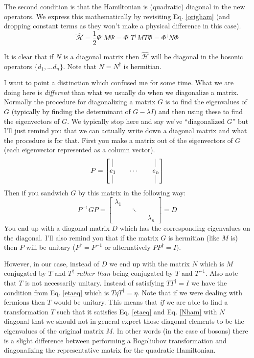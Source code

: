 \documentclass[12pt]{article}
\begin{document}
The second condition is that the Hamiltonian is (quadratic) diagonal in the new operators. We express this mathematically by revisiting Eq. \ref{origham} (and dropping constant terms as they won't make a physical difference in this case).
\begin{equation}
\label{Nham}
\hat{\mathcal{H}} = \frac{1}{2} \Psi^{\dagger} M \Psi = \Phi^{\dagger}T^{\dagger} M T \Phi = \Phi^{\dagger} N \Phi
\end{equation}

It is clear that if $N$ is a diagonal matrix then $\hat{\mathcal{H}}$ will be diagonal in the bosonic operators $\{d_1, ... d_n\}$. Note that $N=N^{\dag}$ is hermitian.

I want to point a distinction which confused me for some time. What we are doing here is \textit{different} than what we usually do when we diagonalize a matrix. Normally the procedure for diagonalizing a matrix $G$ is to find the eigenvalues of $G$ (typically by finding the determinant of $G-\lambda I$) and then using these to find the eigenvectors of $G$. We typically stop here and say we've ``diagonalized $G$'' but I'll just remind you that we can actually write down a diagonal matrix and what the procedure is for that. First you make a matrix out of the eigenvectors of $G$ (each eigenvector represented as a column vector).
\begin{equation}
P = \begin{bmatrix}
\vline && && \vline\\
e_1 && \cdots && e_n\\
\vline && && \vline
\end{bmatrix}
\end{equation}
Then if you sandwich $G$ by this matrix in the following way:
\begin{equation}
P^{-1}GP = \begin{bmatrix}
\lambda_1 && &&\\
&& \ddots && \\
&& && \lambda_n
\end{bmatrix} = D
\end{equation} 
You end up with a diagonal matrix $D$ which has the corresponding eigenvalues on the diagonal. I'll also remind you that if the matrix $G$ is hermitian (like $M$ is) then $P$ will be unitary ($P^{\dagger} = P^{-1}$ or alternatively $PP^{\dagger} = I)$.

However, in our case, instead of $D$ we end up with the matrix $N$ which is $M$ conjugated by $T$ and $T^{\dagger}$ \textit{rather than} being conjugated by $T$ and $T^{-1}$. Also note that $T$ is not necessarily unitary. Instead of satisfying $TT^{\dagger} = I$ we have the condition from Eq. \ref{etaeq} which is $T \eta T^{\dagger} = \eta$. Note that if we were dealing with fermions then $T$ would be unitary. This means that \textit{if} we are able to find a transformation $T$ such that it satisfies Eq. \ref{etaeq} and Eq. \ref{Nham} with $N$ diagonal that we should not in general expect those diagonal elements to be the eigenvalues of the original matrix $M$. In other words (in the case of bosons) there is a slight difference between performing a Bogoliubov transformation and diagonalizing the representative matrix for the quadratic Hamiltonian.
\end{document}
